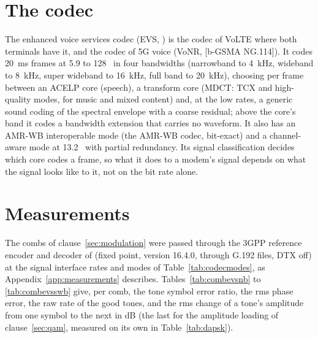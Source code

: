 \section{The codec}
The enhanced voice services codec (EVS, ) is the codec of
VoLTE where both terminals have it, and the codec of 5G voice (VoNR,
[b-GSMA NG.114]).  It codes 20~ms frames at 5.9 to 128~\kbs{} in four
bandwidths (narrowband to 4~kHz, wideband to 8~kHz, super wideband to
16~kHz, full band to 20~kHz), choosing per frame between an ACELP core
(speech), a transform core (MDCT: TCX and high-quality modes, for music
and mixed content) and, at the low rates, a generic sound coding of the
spectral envelope with a coarse residual; above the core's band it codes
a bandwidth extension that carries no waveform.  It also has an AMR-WB
interoperable mode (the AMR-WB codec, bit-exact) and a channel-aware mode
at 13.2~\kbs{} with partial redundancy.  Its signal classification
decides which core codes a frame, so what it does to a modem's signal
depends on what the signal looks like to it, not on the bit rate alone.

\section{Measurements}
The combs of clause~\ref{sec:modulation} were passed through the 3GPP
reference encoder and decoder of  (fixed point, version
16.4.0, through G.192 files, DTX off) at the signal interface rates and
modes of Table~\ref{tab:codecmodes}, as Appendix~\ref{app:measurements}
describes.  Tables~\ref{tab:combevsnb} to \ref{tab:combevsswb} give, per
comb, the tone symbol error ratio, the rms phase error, the raw rate of
the good tones, and the rms change of a tone's amplitude from one symbol
to the next in dB (the last for the amplitude loading of
clause~\ref{sec:qam}, measured on its own in Table~\ref{tab:dapsk}).

\begin{table}[htbp]
\caption{EVS at the 8000~Hz interface (narrowband): tone SER / rms phase error / raw rate of the good tones (bit/s) / rms amplitude change (dB)}
\label{tab:combevsnb}
\centering\scriptsize
\resizebox{\textwidth}{!}{\tabcombevsnb}
\end{table}
\begin{table}[htbp]
\caption{EVS at the 16000~Hz interface (wideband); EVS AMR-WB IO is the codec's AMR-WB mode}
\label{tab:combevswb}
\centering\scriptsize
\resizebox{\textwidth}{!}{\tabcombevswb}
\end{table}
\begin{table}[htbp]
\caption{EVS at the 32000~Hz interface (super wideband): the S200, S300 and S400 combs to 14~kHz}
\label{tab:combevsswb}
\centering\scriptsize
\resizebox{\textwidth}{!}{\tabcombevsswb}
\end{table}

